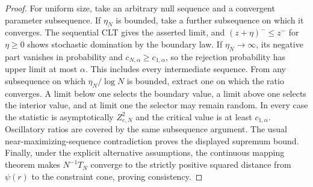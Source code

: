 \begin{proof}
For uniform size, take an arbitrary null sequence and a convergent parameter
subsequence.  If \(\eta_N\) is bounded, take a further subsequence on which
it converges.  The sequential CLT gives the asserted limit, and
\((z+\eta)^-\le z^-\) for \(\eta\ge0\) shows stochastic domination by the
boundary law.  If \(\eta_N\to\infty\), its negative part vanishes in
  probability and \(c_{N,\alpha}\ge c_{1,\alpha}\), so the rejection
  probability has upper limit at most \(\alpha\).  This includes every
  intermediate sequence.  From any subsequence on which
  \(\eta_N/\log N\) is bounded, extract one on which the ratio converges.  A
  limit below one selects the boundary value, a limit above one selects the
  interior value, and at limit one the selector may remain random.  In every
  case the statistic is asymptotically \(Z_{e,N}^2\) and the critical value
  is at least \(c_{1,\alpha}\).  Oscillatory ratios are covered by the same
  subsequence argument.  The usual near-maximizing-sequence contradiction
  proves the displayed supremum bound.
Finally, under the explicit alternative assumptions, the continuous mapping
theorem makes \(N^{-1}T_N\) converge to the strictly positive squared
distance from \(\psi(r)\) to the constraint cone, proving consistency.
\end{proof}

